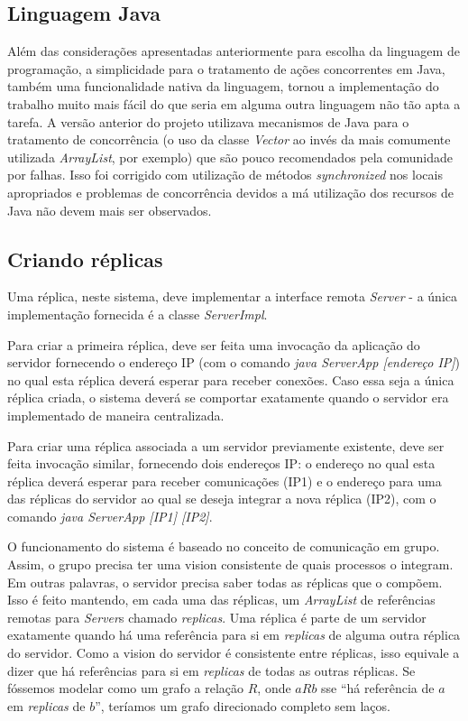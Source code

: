 \documentclass[../main.tex]{subfiles}
\begin{document}
\subsection{Linguagem Java}

Além das considerações apresentadas anteriormente para escolha da linguagem de programação, a simplicidade para o tratamento de ações concorrentes em Java, também uma funcionalidade nativa da linguagem, tornou a implementação do trabalho muito mais fácil do que seria em alguma outra linguagem não tão apta a tarefa.
A versão anterior do projeto utilizava mecanismos de Java para o tratamento de concorrência (o uso da classe \textit{Vector} ao invés da mais comumente utilizada \textit{ArrayList}, por exemplo) que são pouco recomendados pela comunidade por falhas.
Isso foi corrigido com utilização de métodos \textit{synchronized} nos locais apropriados e problemas de concorrência devidos a má utilização dos recursos de Java não devem mais ser observados.

\subsection{Criando réplicas} \label{subsec:replicas}

Uma réplica, neste sistema, deve implementar a interface remota \textit{Server} - a única implementação fornecida é a classe \textit{ServerImpl}.

Para criar a primeira réplica, deve ser feita uma invocação da aplicação do servidor fornecendo o endereço IP (com o comando \textit{java ServerApp [endereço IP]}) no qual esta réplica deverá esperar para receber conexões.
Caso essa seja a única réplica criada, o sistema deverá se comportar exatamente quando o servidor era implementado de maneira centralizada.

Para criar uma réplica associada a um servidor previamente existente, deve ser feita invocação similar, fornecendo dois endereços IP: o endereço no qual esta réplica deverá esperar para receber comunicações (IP1) e o endereço para uma das réplicas do servidor ao qual se deseja integrar a nova réplica (IP2), com o comando \textit{java ServerApp [IP1] [IP2]}.

O funcionamento do sistema é baseado no conceito de comunicação em grupo.
Assim, o grupo precisa ter uma vision consistente de quais processos o integram.
Em outras palavras, o servidor precisa saber todas as réplicas que o compõem.
Isso é feito mantendo, em cada uma das réplicas, um \textit{ArrayList} de referências remotas para \textit{Server}s chamado \textit{replicas}.
Uma réplica é parte de um servidor exatamente quando há uma referência para si em \textit{replicas} de alguma outra réplica do servidor.
Como a vision do servidor é consistente entre réplicas, isso equivale a dizer que há referências para si em \textit{replicas} de todas as outras réplicas.
Se fóssemos modelar como um grafo a relação $R$, onde $aRb$ sse ``há referência de $a$ em \textit{replicas} de $b$'', teríamos um grafo direcionado completo sem laços.
\end{document}
